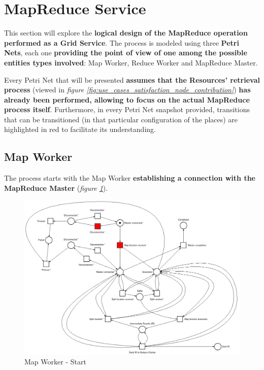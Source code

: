 \section{MapReduce Service}\label{mapreduce_service}
This section will explore the \textbf{logical design of the MapReduce operation performed as a Grid Service}. The process is modeled using three \textbf{Petri Nets}, each one \textbf{providing the point of view of one among the possible entities types involved}: Map Worker, Reduce Worker and MapReduce Master.

Every Petri Net that will be presented \textbf{assumes that the Resources' retrieval process} (viewed in \textit{figure \ref{fig:use_cases_satisfaction_node_contribution}}) \textbf{has already been performed, allowing to focus on the actual MapReduce process itself}.
Furthermore, in every Petri Net snapshot provided, transitions that can be transitioned (in that particular configuration of the places) are highlighted in red to facilitate its understanding.
  
\subsection{Map Worker}
The process starts with the Map Worker \textbf{establishing a connection with the MapReduce Master} (\textit{figure \ref{fig:map_worker_petri_net_1}}).

\vspace{5mm}

\begin{figure}[!ht]
    \centering
    \includegraphics[width=\linewidth]{document/chapters/chapter_6/images/map_worker_petri_net_1.png}
    \caption{Map Worker - Start}
    \label{fig:map_worker_petri_net_1}
\end{figure}

